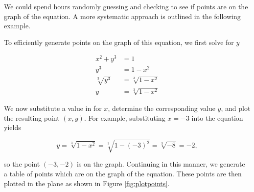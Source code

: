 We could spend hours randomly guessing and checking to see if points are on the graph of the equation.  A more systematic approach is outlined in the following example.

\pagebreak

{
To  efficiently generate points on the graph of this equation, we first solve for $y$

\begin{align*}
    x^2 + y^3 & =  1  \\ 
          y^3 & =  1 - x^2  \\
\sqrt[3]{y^3} & =  \sqrt[3]{1 - x^2}  \\
            y & =  \sqrt[3]{1 - x^2} 
\end{align*}

We now substitute a value in for $x$, determine the corresponding value $y$, and plot the resulting point $(x,y)$.  For example, substituting $x=-3$ into the equation yields

\[
y = \sqrt[3]{1 - x^2} = \sqrt[3]{1 - (-3)^2} = \sqrt[3]{-8} = - 2,
\]

so the point $(-3, -2)$ is on the graph.  Continuing in this manner, we generate a table of points which are on the graph of the equation.  These points are then plotted in the plane as shown in Figure \ref{fig:plotpoints}.


}
